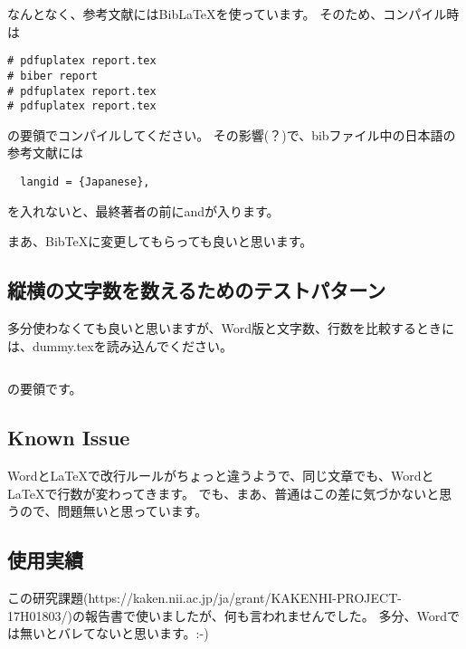 \documentclass[uplatex,dvipdfmx,11pt]{jsarticle}
\begin{document}
なんとなく、参考文献にはBibLaTeXを使っています。
そのため、コンパイル時は
\begin{verbatim}
# pdfuplatex report.tex
# biber report
# pdfuplatex report.tex
# pdfuplatex report.tex
\end{verbatim}
の要領でコンパイルしてください。
その影響(？)で、bibファイル中の日本語の参考文献には
\begin{verbatim}
  langid = {Japanese},
\end{verbatim}
を入れないと、最終著者の前にandが入ります。

まあ、BibTeXに変更してもらっても良いと思います。


\subsection{縦横の文字数を数えるためのテストパターン}
多分使わなくても良いと思いますが、Word版と文字数、行数を比較するときには、dummy.texを読み込んでください。
\begin{verbatim}

\end{verbatim}
の要領です。

\subsection{Known Issue}
WordとLaTeXで改行ルールがちょっと違うようで、同じ文章でも、WordとLaTeXで行数が変わってきます。
でも、まあ、普通はこの差に気づかないと思うので、問題無いと思っています。

\subsection{使用実績}
この研究課題(https://kaken.nii.ac.jp/ja/grant/KAKENHI-PROJECT-17H01803/)の報告書で使いましたが、何も言われませんでした。
多分、Wordでは無いとバレてないと思います。:-)


\printbibliography[title=参考文献]
\end{document}
